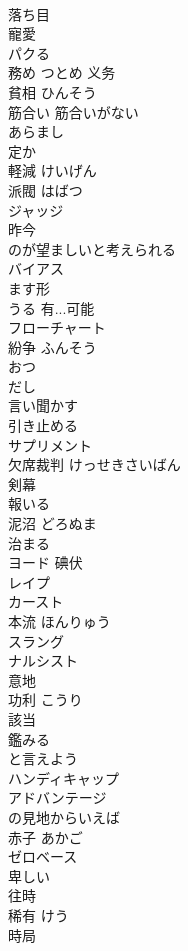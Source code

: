 \documentclass[8pt]{extreport}
\begin{document}
\begin{CJK}{UTF8}{min}
\\	落ち目	
\\	寵愛	
\\	パクる	
\\	務め	つとめ 义务
\\	貧相	ひんそう
\\	筋合い	筋合いがない
\\	あらまし	
\\	定か	
\\	軽減	けいげん
\\	派閥	はばつ
\\	ジャッジ	
\\	昨今	
\\	のが望ましいと考えられる	
\\	バイアス	
\\	ます形
\\	うる	有...可能
\\	フローチャート	
\\	紛争	ふんそう
\\	おつ	
\\	だし	
\\	言い聞かす	
\\	引き止める	
\\	サプリメント	
\\	欠席裁判	けっせきさいばん
\\	剣幕	
\\	報いる	
\\	泥沼	どろぬま
\\	治まる	
\\	ヨード	碘伏
\\	レイプ	
\\	カースト	
\\	本流	ほんりゅう
\\	スラング	
\\	ナルシスト	
\\	意地	
\\	功利	こうり
\\	該当	
\\	鑑みる	
\\	と言えよう	
\\	ハンディキャップ	
\\	アドバンテージ	
\\	の見地からいえば	
\\	赤子	あかご
\\	ゼロベース	
\\	卑しい	
\\	往時	
\\	稀有	けう
\\	時局	

\end{CJK}
\end{document}
